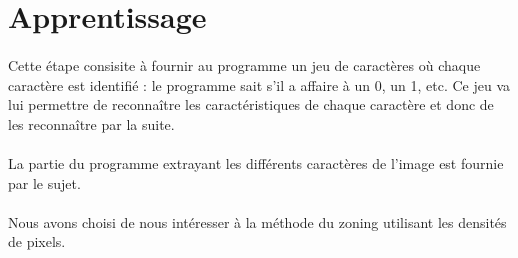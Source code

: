 \section{Apprentissage}

\paragraph{}
Cette étape consisite à fournir au programme un jeu de caractères où chaque caractère est identifié : le programme sait s'il a affaire à un 0, un 1, etc. 
Ce jeu va lui permettre de reconnaître les caractéristiques de chaque caractère et donc de les reconnaître par la suite. 

\paragraph{}
La partie du programme extrayant les différents caractères de l'image est fournie par le sujet. 

\paragraph{}
Nous avons choisi de nous intéresser à la méthode du zoning utilisant les densités de pixels. 
